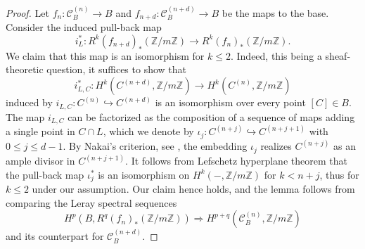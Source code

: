 \documentclass[11pt]{amsart}
\theoremstyle{plain}
\theoremstyle{definition}
\theoremstyle{remark}
\begin{document}
\begin{proof}
    Let $f_{n}: \mathcal{C}_B^{(n)} \to B$ and $f_{n+d}: \mathcal{C}_B^{(n+d)}\to B$ be the maps to the base. Consider the induced pull-back map
    \[
    i_L^*: R^k (f_{n+d})_* (\mathbb Z/ m \mathbb Z) \to  R^k (f_{n})_* (\mathbb Z/ m \mathbb Z).
    \]
    We claim that this map is an isomorphism for $k\leq 2$. Indeed, this being a sheaf-theoretic question, it suffices to show that
    \[
    i_{L,C}^*: H^k(C^{(n+d)}, \mathbb Z/m \mathbb Z) \to H^k(C^{(n)}, \mathbb Z/ m \mathbb Z)
    \]
    induced by $i_{L,C}: C^{(n)} \hookrightarrow C^{(n+d)}$ is an isomorphism over every point $[C]\in B$. The map $i_{L,C}$ can be factorized as the composition of a sequence of maps adding a single point in $C \cap L$, which we denote by $\iota_j: C^{(n+j)} \hookrightarrow C^{(n+j+1)}$ with $0\leq j \leq d-1$. By Nakai's criterion, see \cite[Chapter~VII, Proposition~2.2]{ACGH85}, the embedding $\iota_j$ realizes $C^{(n+j)}$ as an ample divisor in $C^{(n+j+1)}$. It follows from Lefschetz hyperplane theorem that the pull-back map $\iota_j^*$ is an isomorphism on $H^k(-, \mathbb Z/m \mathbb Z)$ for $k< n+j$, thus for $k\leq 2$ under our assumption. Our claim hence holds, and the lemma follows from comparing the Leray spectral sequences
    \[
    H^p(B, R^q (f_{n})_* (\mathbb Z/m \mathbb Z)) \Rightarrow H^{p+q}(\mathcal{C}_B^{(n)}, \mathbb Z/ m \mathbb Z)
    \]
    and its counterpart for $\mathcal{C}_B^{(n+d)}$.
\end{proof}
\end{document}
